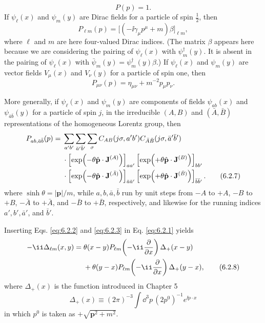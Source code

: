 \begin{equation}
P(p)=1.
\tag{6.2.4}
\label{eq:6.2.4}
\end{equation}
If $\psi_\ell(x)$ and $\psi_m(y)$ are Dirac fields for a particle of spin
$\tfrac12$, then
\begin{equation}
P_{\ell m}(p)=\bigl[(-\ii\gamma_\mu p^\mu+m)\beta\bigr]_{\ell m},
\tag{6.2.5}
\label{eq:6.2.5}
\end{equation}
where $\ell$ and $m$ are here four-valued Dirac indices. (The matrix $\beta$
appears here because we are considering the pairing of $\psi_\ell(x)$ with
$\psi_m^\dagger(y)$. It is absent in the pairing of $\psi_\ell(x)$ with
$\bar\psi_m(y)=\psi_m^\dagger(y)\beta$.) If $\psi_\ell(x)$ and $\psi_m(y)$ are
vector fields $V_\mu(x)$ and $V_\nu(y)$ for a particle of spin one, then
\begin{equation}
P_{\mu\nu}(p)=\eta_{\mu\nu}+m^{-2}p_\mu p_\nu.
\tag{6.2.6}
\label{eq:6.2.6}
\end{equation}

More generally, if $\psi_\ell(x)$ and $\psi_m(y)$ are components of fields
$\psi_{ab}(x)$ and $\psi_{\bar a\bar b}(y)$ for a particle of spin $j$, in the
irreducible $(A,B)$ and $(\bar A,\bar B)$ representations of the homogeneous
Lorentz group, then
\begin{align}
P_{ab,\bar a\bar b}(p)={}&
 \sum_{a'b'}\sum_{\bar a'\bar b'}\sum_\sigma
 C_{AB}(j\sigma,a'b')C_{\bar A\bar B}(j\sigma,\bar a'\bar b')
\notag\\
&\cdot\left[\exp\!\left(-\theta\hat{\mathbf p}\cdot
 \mathbf J^{(A)}\right)\right]_{aa'}
 \left[\exp\!\left(+\theta\hat{\mathbf p}\cdot
 \mathbf J^{(B)}\right)\right]_{bb'}
\notag\\
&\cdot\left[\exp\!\left(-\theta\hat{\mathbf p}\cdot
 \mathbf J^{(\bar A)}\right)\right]_{\bar a\bar a'}
 \left[\exp\!\left(+\theta\hat{\mathbf p}\cdot
 \mathbf J^{(\bar B)}\right)\right]_{\bar b\bar b'}.
\tag{6.2.7}
\label{eq:6.2.7}
\end{align}
where $\sinh\theta=|\mathbf p|/m$, while $a,b,\bar a,\bar b$ run by unit
steps from $-A$ to $+A$, $-B$ to $+B$, $-\bar A$ to $+\bar A$, and $-\bar B$
to $+\bar B$, respectively, and likewise for the running indices $a',b',\bar
a'$, and $\bar b'$.

Inserting Eqs. \eqref{eq:6.2.2} and \eqref{eq:6.2.3} in Eq. \eqref{eq:6.2.1} yields
\begin{align}
-\ii\Delta_{\ell m}(x,y)={}&
 \theta(x-y)P_{\ell m}\!\left(-\ii\frac{\partial}{\partial x}\right)
 \Delta_+(x-y)
\notag\\
&+\theta(y-x)P_{\ell m}\!\left(-\ii\frac{\partial}{\partial x}\right)
 \Delta_+(y-x),
\tag{6.2.8}
\label{eq:6.2.8}
\end{align}
where $\Delta_+(x)$ is the function introduced in Chapter 5
\begin{equation}
\Delta_+(x)\equiv(2\pi)^{-3}\int \dd^3p\,(2p^0)^{-1}e^{\ii p\cdot x}
\tag{6.2.9}
\label{eq:6.2.9}
\end{equation}
in which $p^0$ is taken as $+\sqrt{\mathbf p^2+m^2}$.

